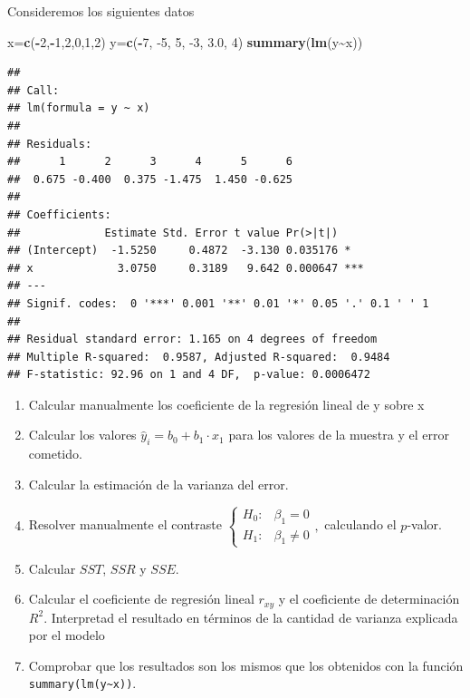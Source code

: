 \documentclass[
]{article}
\newenvironment{Shaded}{\begin{snugshade}}{\end{snugshade}}
\newcommand{\DecValTok}[1]{\textcolor[rgb]{0.00,0.00,0.81}{#1}}
\newcommand{\FloatTok}[1]{\textcolor[rgb]{0.00,0.00,0.81}{#1}}
\newcommand{\KeywordTok}[1]{\textcolor[rgb]{0.13,0.29,0.53}{\textbf{#1}}}
\newcommand{\NormalTok}[1]{#1}
\newcommand{\OperatorTok}[1]{\textcolor[rgb]{0.81,0.36,0.00}{\textbf{#1}}}
\providecommand{\tightlist}{%
  \setlength{\itemsep}{0pt}\setlength{\parskip}{0pt}}
\begin{document}
Consideremos los siguientes datos

\begin{Shaded}
\begin{Highlighting}[]
\NormalTok{x=}\KeywordTok{c}\NormalTok{(}\OperatorTok{{-}}\DecValTok{2}\NormalTok{,}\OperatorTok{{-}}\DecValTok{1}\NormalTok{,}\DecValTok{2}\NormalTok{,}\DecValTok{0}\NormalTok{,}\DecValTok{1}\NormalTok{,}\DecValTok{2}\NormalTok{)}
\NormalTok{y=}\KeywordTok{c}\NormalTok{(}\OperatorTok{{-}}\DecValTok{7}\NormalTok{, }\DecValTok{{-}5}\NormalTok{,  }\DecValTok{5}\NormalTok{, }\DecValTok{{-}3}\NormalTok{,  }\FloatTok{3.0}\NormalTok{,  }\DecValTok{4}\NormalTok{)}
\KeywordTok{summary}\NormalTok{(}\KeywordTok{lm}\NormalTok{(y}\OperatorTok{\textasciitilde{}}\NormalTok{x))}
\end{Highlighting}
\end{Shaded}

\begin{verbatim}
## 
## Call:
## lm(formula = y ~ x)
## 
## Residuals:
##      1      2      3      4      5      6 
##  0.675 -0.400  0.375 -1.475  1.450 -0.625 
## 
## Coefficients:
##             Estimate Std. Error t value Pr(>|t|)    
## (Intercept)  -1.5250     0.4872  -3.130 0.035176 *  
## x             3.0750     0.3189   9.642 0.000647 ***
## ---
## Signif. codes:  0 '***' 0.001 '**' 0.01 '*' 0.05 '.' 0.1 ' ' 1
## 
## Residual standard error: 1.165 on 4 degrees of freedom
## Multiple R-squared:  0.9587, Adjusted R-squared:  0.9484 
## F-statistic: 92.96 on 1 and 4 DF,  p-value: 0.0006472
\end{verbatim}

\begin{enumerate}
\def\labelenumi{\arabic{enumi}.}
\tightlist
\item
  Calcular manualmente los coeficiente de la regresión lineal de y sobre
  x
\item
  Calcular los valores \(\hat{y}_i=b_0+b_1\cdot x_1\) para los valores
  de la muestra y el error cometido.
\item
  Calcular la estimación de la varianza del error.
\item
  Resolver manualmente el contraste
  \(\left\{\begin{array}{ll} H_0: & \beta_1=0 \\ H_1: & \beta_1\not=0\end{array}\right.,\)
  calculando el \(p\)-valor.
\item
  Calcular \(SST\), \(SSR\) y \(SSE\).
\item
  Calcular el coeficiente de regresión lineal \(r_{xy}\) y el
  coeficiente de determinación \(R^2\). Interpretad el resultado en
  términos de la cantidad de varianza explicada por el modelo
\item
  Comprobar que los resultados son los mismos que los obtenidos con la
  función \texttt{summary(lm(y\textasciitilde{}x))}.
\end{enumerate}
\end{document}
